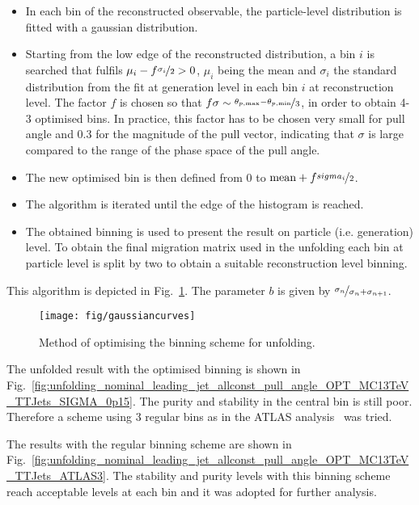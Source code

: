 \begin{itemize}
\item In each bin of the reconstructed observable, the particle-level distribution is fitted with a gaussian distribution.
\item Starting from the low edge of the reconstructed distribution, a bin $i$ is searched that fulfils $\mu_{i}-f\nicefrac{\sigma_{i}}{2} > 0$, $\mu_{i}$ being the mean and $\sigma_{i}$ the standard distribution from the fit at generation level in each bin $i$ at reconstruction level. The factor $f$ is chosen so that $f\sigma\sim\nicefrac{\theta_{p,\max}-\theta_{p, \min}}{3}$, in order to obtain 4-3 optimised bins. In practice, this factor has to be chosen very small  for pull angle and 0.3 for the magnitude of the pull vector, indicating that $\sigma$ is large compared to the range of the phase space of the pull angle.
\item The new optimised bin is then defined from 0 to $\text{mean}+f\nicefrac{sigma_{i}}{2}$. 
\item The algorithm is iterated until the edge of the histogram is reached.
\item The obtained binning is used to present the result on particle (i.e. generation) level. To obtain the final migration matrix used in the unfolding each bin at particle level is split by two to obtain a suitable reconstruction level binning.
\end{itemize}

This algorithm is depicted in Fig.~\ref{fig:gaussiancurves}. The parameter $b$ is given by $\nicefrac{\sigma_{n}}{\sigma_{n} + \sigma_{n+1}}$.

\begin{figure}
  \centering
  \texttt{[image: fig/gaussiancurves]}
  \caption{Method of optimising the binning scheme for unfolding.}
  \label{fig:gaussiancurves}
\end{figure}

The unfolded result with the optimised binning is shown in Fig.~\ref{fig:unfolding_nominal_leading_jet_allconst_pull_angle_OPT_MC13TeV_TTJets_SIGMA_0p15}. The purity and stability in the central bin is still poor. Therefore a scheme using 3 regular bins as in the ATLAS analysis~\cite{ATLAS:2017iaz} was tried.

The results with the regular binning scheme are shown in Fig.~\ref{fig:unfolding_nominal_leading_jet_allconst_pull_angle_OPT_MC13TeV_TTJets_ATLAS3}. The stability and purity levels with this binning scheme reach acceptable levels at each bin and it was adopted for further analysis.

